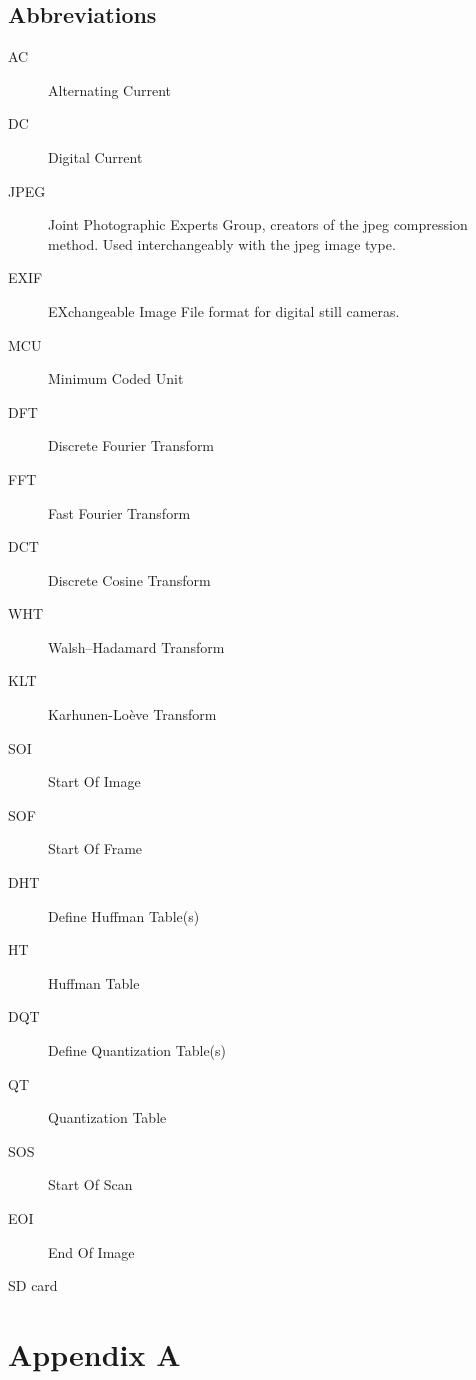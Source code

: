 \documentclass[oneside]{ecsgdp}         %
\begin{document}
\section*{Abbreviations} 
\begin{description}
	\item[AC] Alternating Current 
	\item[DC] Digital Current 
	\item[JPEG] Joint Photographic Experts Group, creators of the jpeg compression method. Used interchangeably with the jpeg image type.
	\item[EXIF] EXchangeable Image File format for digital still cameras.
	\item[MCU] Minimum Coded Unit
	\item[DFT] Discrete Fourier Transform
	\item[FFT] Fast Fourier Transform
	\item[DCT] Discrete Cosine Transform
	\item[WHT] Walsh–Hadamard Transform
	\item[KLT] Karhunen-Lo\`eve Transform
	\item[SOI] Start Of Image
	\item[SOF] Start Of Frame
	\item[DHT] Define Huffman Table(s)
	\item[HT] Huffman Table
	\item[DQT] Define Quantization Table(s)
	\item[QT] Quantization Table
	\item[SOS] Start Of Scan
	\item[EOI] End Of Image
	\item[SD card]
\end{description}
\chapter{Appendix A}


\end{document}
